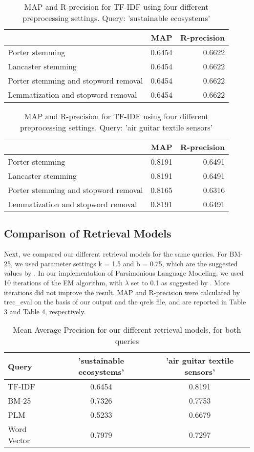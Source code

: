 \documentclass{article}
\begin{document}
\begin{table}[h]
\begin{tabular}{|l|c|r|}
\hline
 & MAP & R-precision \\ \hline
Porter stemming & 0.6454 & 0.6622 \\ \hline
Lancaster stemming & 0.6454 & 0.6622 \\ \hline
Porter stemming and stopword removal & 0.6454 & 0.6622 \\ \hline
Lemmatization and stopword removal & 0.6454 & 0.6622 \\ \hline
\end{tabular}
\caption{MAP and R-precision for TF-IDF using four different preprocessing settings. Query: 'sustainable ecosystems'}
\end{table}
\begin{table}[h]
\begin{tabular}{|l|c|r|}
\hline
 & MAP & R-precision \\ \hline
Porter stemming & 0.8191 & 0.6491 \\ \hline
Lancaster stemming & 0.8191 & 0.6491 \\ \hline
Porter stemming and stopword removal & 0.8165 & 0.6316 \\ \hline
Lemmatization and stopword removal & 0.8191 & 0.6491 \\ \hline
\end{tabular}
\caption{MAP and R-precision for TF-IDF using four different preprocessing settings. Query: 'air guitar textile sensors'} 
\end{table} 

\subsection*{Comparison of Retrieval Models}

Next, we compared our different retrieval models for the same queries. For BM-25, we used parameter settings k = 1.5 and b = 0.75, which are the suggested values by \cite{robertson1995okapi}. In our implementation of Parsimonious Language Modeling, we used 10 iterations of the EM algorithm, with $\lambda$ set to 0.1 as suggested by \cite{hiemstra2004parsimonious}. More iterations did not improve the result.  MAP and R-precision were calculated by trec\_eval on the basis of our output and the qrels file, and are reported in Table 3 and Table 4, respectively.

\begin{table}[h]
\caption{Mean Average Precision for our different retrieval models, for both queries}
\begin{tabular}{|l|c|c|}
\hline
Query & 'sustainable ecosystems' & 'air guitar textile sensors' \\ \hline
TF-IDF & 0.6454 & 0.8191 \\ \hline
BM-25 & 0.7326 & 0.7753 \\ \hline
PLM & 0.5233 & 0.6679 \\ \hline
Word Vector & 0.7979	 & 0.7297 \\ \hline
\end{tabular}
\end{table}
\end{document}
